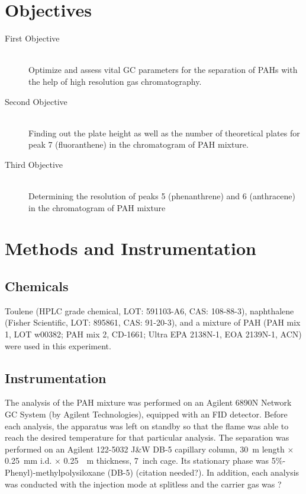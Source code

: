 \documentclass[a4paper, 12pt]{article}
\begin{document}

\section{Objectives}

\begin{description}
	\item[First Objective] \hfill \\
		Optimize and assess vital GC parameters for the separation of PAHs with the help of high resolution gas chromatography.
	\item[Second Objective] \hfill \\
		Finding out the plate height as well as the number of theoretical plates for peak \num{7} (fluoranthene) in the chromatogram of PAH mixture.
	\item[Third Objective] \hfill \\
		Determining the resolution of peaks \num{5} (phenanthrene) and \num{6} (anthracene) in the chromatogram of PAH mixture
\end{description}
 

\section{Methods and Instrumentation}

\subsection{Chemicals}
Toulene (HPLC grade chemical, LOT: 591103-A6, CAS: 108-88-3), naphthalene (Fisher Scientific, LOT: 895861, CAS: 91-20-3), and a mixture of PAH (PAH mix 1, LOT w00382; PAH mix 2, CD-1661; Ultra EPA 2138N-1, EOA 2139N-1, ACN) were used in this experiment.

\subsection{Instrumentation}
The analysis of the PAH mixture was performed on an Agilent 6890N Network GC System (by Agilent Technologies), equipped with an FID detector. Before each analysis, the apparatus was left on standby so that the flame was able to reach the desired temperature for that particular analysis. The separation was performed on an Agilent 122-5032 J\&W DB-5 capillary column, \SI{30}{m} length $\times$ \SI{0.25}{mm} i.d. $\times$ \SI{0.25}{\mu{}m} thickness, \SI{7}{inch} cage. Its stationary phase was 5$\%$-Phenyl)-methylpolysiloxane (DB-5) (citation needed?). In addition, each analysis was conducted with the injection mode at splitless and the carrier gas was ?
\end{document}
